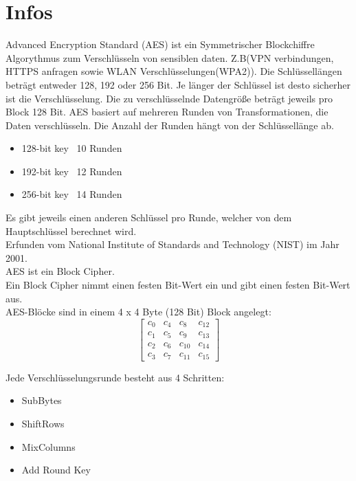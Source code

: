 \section{Infos}
\setlength{\parindent}{0pt}

Advanced Encryption Standard (AES) ist ein Symmetrischer Blockchiffre Algorythmus zum 
Verschlüsseln von sensiblen daten. Z.B(VPN verbindungen, HTTPS anfragen sowie WLAN Verschlüsselungen(WPA2)).
Die Schlüssellängen beträgt entweder 128, 192 oder 256 Bit. Je länger der Schlüssel ist desto sicherher ist die Verschlüsselung.
Die zu verschlüsselnde Datengröße beträgt jeweils pro Block 128 Bit.
AES basiert auf mehreren Runden von Transformationen, die Daten verschlüsseln. Die Anzahl der Runden hängt von der Schlüssellänge ab.
\begin{itemize}
    \item 128-bit key \textendash\ 10 Runden
    \item 192-bit key \textendash\ 12 Runden
    \item 256-bit key \textendash\ 14 Runden
\end{itemize}

Es gibt jeweils einen anderen Schlüssel pro Runde, welcher von dem Hauptschlüssel berechnet wird.\\

Erfunden vom National Institute of Standards and Technology (NIST) im Jahr 2001.\\

AES ist ein Block Cipher.\\
Ein Block Cipher nimmt einen festen Bit-Wert ein und gibt einen festen Bit-Wert aus.\\

AES-Blöcke sind in einem 4 x 4 Byte (128 Bit) Block angelegt:\\

\[
\begin{bmatrix}
c_0  & c_4  & c_8  & c_{12} \\
c_1  & c_5  & c_9  & c_{13} \\
c_2  & c_6  & c_{10} & c_{14} \\
c_3  & c_7  & c_{11} & c_{15}
\end{bmatrix}
\]

Jede Verschlüsselungsrunde besteht aus 4 Schritten:\\
\begin{itemize}
    \item SubBytes
    \item ShiftRows
    \item MixColumns
    \item Add Round Key
\end{itemize}

